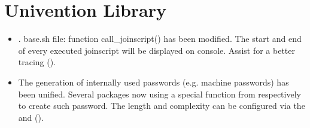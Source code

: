 






\section{Univention Library}
\begin{itemize}

\item {}. base.sh file: function call\_joinscript() has
been modified. The start and end of  every executed joinscript will be
displayed on console. Assist for a better tracing ().

\item The generation of internally used passwords (e.g. machine passwords) has
been unified. Several packages now using a special function from
 respectively  to
create such password. The length and complexity can be configured via the
 and
 ().

\end{itemize}


